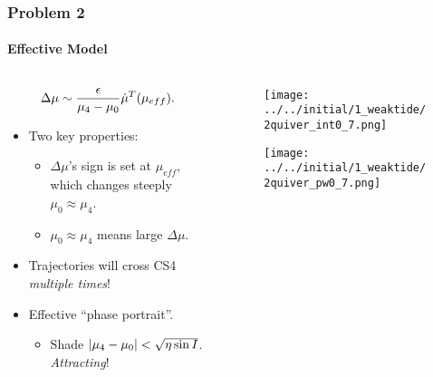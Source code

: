 \documentclass[dvipsnames, 11pt]{beamer}
\DeclarePairedDelimiter\abs{\lvert}{\rvert}
\DeclarePairedDelimiter\p{\lparen}{\rparen}
\begin{document}
\begin{frame}
    \frametitle{Problem 2}
    \framesubtitle{Effective Model}

    \begin{columns}
        \begin{column}{0.5\textwidth}
            \begin{equation*}
                \Delta \mu \sim \frac{\epsilon}{\mu_4 - \mu_0}
                        \dot{\mu}^{T}\p*{\mu_{eff}}.
            \end{equation*}
            \begin{itemize}
                \item Two key properties:
                    \begin{itemize}
                        \item $\Delta \mu$'s sign is set at $\mu_{eff}$, which
                            changes steeply $\mu_0 \approx \mu_4$.

                        \item $\mu_0 \approx \mu_4$ means large $\Delta \mu$.
                    \end{itemize}

                \item Trajectories will cross CS4 \emph{multiple times}!

                \item Effective ``phase portrait''.
                    \begin{itemize}
                        \item Shade $\abs*{\mu_4 - \mu_0} < \sqrt{\eta\sin I}$.
                            \emph{Attracting}!
                    \end{itemize}
            \end{itemize}
        \end{column}
        \begin{column}{0.5\textwidth}
            \begin{figure}[t]
                \centering
                \texttt{[image: ../../initial/1\_weaktide/2quiver\_int0\_7.png]}
            \end{figure}
            \begin{figure}[t]
                \centering
                \texttt{[image: ../../initial/1\_weaktide/2quiver\_pw0\_7.png]}
            \end{figure}
        \end{column}
    \end{columns}
\end{frame}
\end{document}
